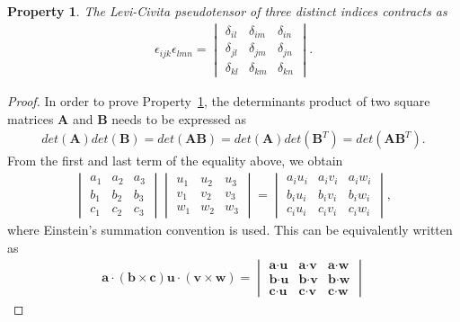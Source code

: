 \documentclass[12pt,a4paper]{report}
\newtheorem{property}{Property}[section]
\theoremstyle{definition}
\theoremstyle{remark}
\theoremstyle{remark}
\begin{document}
\begin{appendices}
\begin{property}\label{plc1}
The Levi-Civita pseudotensor of three distinct indices contracts as
\begin{align*}
\epsilon_{ijk}\epsilon_{lmn}=\begin{vmatrix} 
\delta_{il} & \delta_{im} & \delta_{in}\\
\delta_{jl} & \delta_{jm} & \delta_{jn}\\
\delta_{kl} & \delta_{km} & \delta_{kn}
\end{vmatrix}.
\end{align*}
\end{property}
\begin{proof}
In order to prove Property~\ref{plc1}, the determinants product of two square matrices $\textbf{A}$ and $\textbf{B}$ needs to be expressed as
\begin{align*}
det(\textbf{A})det(\textbf{B})=det(\textbf{A}\textbf{B})=det(\textbf{A})det(\textbf{B}^T)=det(\textbf{A}\textbf{B}^T).
\end{align*}
From the first and last term of the equality above, we obtain
\begin{align*}
\begin{vmatrix} 
a_1 & a_2 & a_3\\
b_1 & b_2 & b_3\\
c_1 & c_2 & c_3
\end{vmatrix}
\begin{vmatrix} 
u_1 & u_2 & u_3\\
v_1 & v_2 & v_3\\
w_1 & w_2 & w_3
\end{vmatrix}
=\begin{vmatrix} 
a_iu_i & a_iv_i & a_iw_i\\
b_iu_i & b_iv_i & b_iw_i\\
c_iu_i & c_iv_i & c_iw_i
\end{vmatrix},
\end{align*}
where Einstein's summation convention is used. This can be equivalently written as
\begin{align*}
\textbf{a}\cdot(\textbf{b}\times\textbf{c})\textbf{u}\cdot(\textbf{v}\times\textbf{w})=
\begin{vmatrix} 
\textbf{a}\cdot\textbf{u} & \textbf{a}\cdot\textbf{v} & \textbf{a}\cdot\textbf{w}\\
\textbf{b}\cdot\textbf{u} & \textbf{b}\cdot\textbf{v} & \textbf{b}\cdot\textbf{w}\\
\textbf{c}\cdot\textbf{u} & \textbf{c}\cdot\textbf{v} & \textbf{c}\cdot\textbf{w}

\end{vmatrix}
\end{align*}
\end{proof}
\end{appendices}
\end{document}
